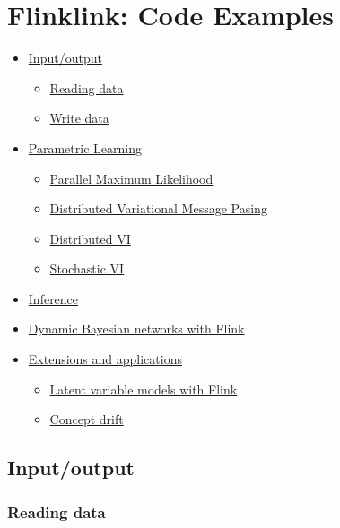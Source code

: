 \documentclass[10pt,a4paper]{article}
\begin{document}
\section{Flinklink: Code Examples}\label{sec:flinklink}

\begin{itemize}
	\item \hyperref[sec:flinklink:io]{Input/output}
	\begin{itemize}
		\item \hyperref[sec:flinklink:io:read]{Reading data}
		\item \hyperref[sec:flinklink:io:write]{Write data}
	\end{itemize}
		\item \hyperref[sec:flinklink:learning]{Parametric Learning}

		
	\begin{itemize}
		\item \hyperref[sec:flinklink:learning:pml]{Parallel Maximum Likelihood}
		\item \hyperref[sec:flinklink:learning:dvmp]{Distributed Variational Message Pasing}
		\item \hyperref[sec:flinklink:learning:dvi]{Distributed VI}
		\item \hyperref[sec:flinklink:learning:svi]{Stochastic VI}
	\end{itemize}
	
	\item  \hyperref[sec:flinklink:inference]{Inference}
	
	
	\item \hyperref[sec:flinklink:dbn]{Dynamic Bayesian networks with Flink}
	\item \hyperref[sec:flinklink:ext]{ Extensions and applications}
	\begin{itemize}
			\item \hyperref[sec:flinklink:ext:models]{ Latent variable models with Flink}
			\item \hyperref[sec:flinklink:ext:conceptdrift]{Concept drift}
	\end{itemize}
\end{itemize}
\subsection{Input/output}\label{sec:flinklink:io}




\subsubsection{Reading data}\label{sec:flinklink:io:read}
\end{document}
